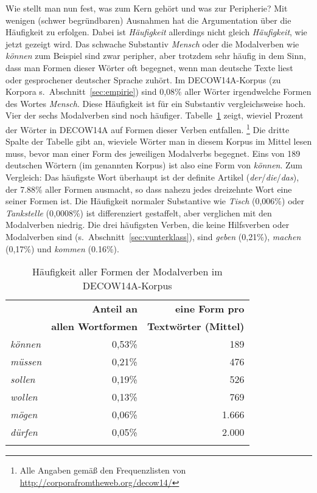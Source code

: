 Wie stellt man nun fest, was zum Kern gehört und was zur Peripherie?
Mit wenigen (schwer begründbaren) Ausnahmen hat die Argumentation über die Häufigkeit zu erfolgen.
Dabei ist \textit{Häufigkeit} allerdings nicht gleich \textit{Häufigkeit}, wie jetzt gezeigt wird.
Das schwache Substantiv \textit{Mensch} oder die Modalverben wie \textit{können} zum Beispiel sind zwar peripher, aber trotzdem sehr häufig in dem Sinn, dass man Formen dieser Wörter oft begegnet, wenn man deutsche Texte liest oder gesprochener deutscher Sprache zuhört.
Im DECOW14A-Korpus (zu Korpora s.\ Abschnitt~\ref{sec:empirie}) sind 0,08\% aller Wörter irgendwelche Formen des Wortes \textit{Mensch}.
Diese Häufigkeit ist für ein Substantiv vergleichsweise hoch.
Vier der sechs Modalverben sind noch häufiger.
Tabelle~\ref{tab:modvfreq} zeigt, wieviel Prozent der Wörter in DECOW14A auf Formen dieser Verben entfallen.%
\footnote{Alle Angaben gemäß den Frequenzlisten von \url{http://corporafromtheweb.org/decow14/}}
Die dritte Spalte der Tabelle gibt an, wieviele Wörter man in diesem Korpus im Mittel lesen muss, bevor man einer Form des jeweiligen Modalverbs begegnet.
Eins von 189 deutschen Wörtern (im genannten Korpus) ist also eine Form von \textit{können}.
Zum Vergleich: Das häufigste Wort überhaupt ist der definite Artikel (\textit{der}\slash\textit{die}\slash\textit{das}), der 7.88\% aller Formen ausmacht, so dass nahezu jedes dreizehnte Wort eine seiner Formen ist.
Die Häufigkeit normaler Substantive wie \textit{Tisch} (0,006\%) oder \textit{Tankstelle} (0,0008\%) ist differenziert gestaffelt, aber verglichen mit den Modalverben niedrig.
Die drei häufigsten Verben, die keine Hilfsverben oder Modalverben sind (s.\ Abschnitt~\ref{sec:vunterklass}), sind \textit{geben} (0,21\%), \textit{machen} (0,17\%) und \textit{kommen} (0.16\%).

\begin{table}[!htbp]
  \begin{tabular}{lrr}
    \lsptoprule
    \multirow{2}{*}{\textbf{Modalverb}} & \textbf{Anteil an} & \textbf{eine Form pro}\\
    & \textbf{allen Wortformen} & \textbf{Textwörter (Mittel)}\\
    \midrule
    \textit{können} & 0,53\% &   189 \\
    \textit{müssen} & 0,21\% &   476 \\
    \textit{sollen} & 0,19\% &   526 \\
    \textit{wollen} & 0,13\% &   769 \\
    \textit{mögen}  & 0,06\% & 1.666\\
    \textit{dürfen} & 0,05\% & 2.000\\
    \lspbottomrule
  \end{tabular}
  \caption{Häufigkeit aller Formen der Modalverben im DECOW14A-Korpus}
  \label{tab:modvfreq}
\end{table}


